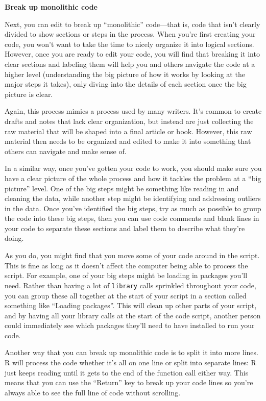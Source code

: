 \documentclass[]{tufte-book}
\begin{document}
\textbf{Break up monolithic code}

Next, you can edit to break up ``monolithic'' code---that is, code that isn't
clearly divided to show sections or steps in the process. When you're first
creating your code, you won't want to take the time to nicely organize it into
logical sections. However, once you are ready to edit your code, you will find
that breaking it into clear sections and labeling them will help you and others
navigate the code at a higher level (understanding the big picture of how it
works by looking at the major steps it takes), only diving into the details of
each section once the big picture is clear.

Again, this process mimics a process used by many writers. It's common to
create drafts and notes that lack clear organization, but instead are just
collecting the raw material that will be shaped into a final article or book.
However, this raw material then needs to be organized and edited to make it
into something that others can navigate and make sense of.

In a similar way, once you've gotten your code to work, you should make sure you have
a clear picture of the whole process and how it tackles the problem at a
``big picture'' level. One of the big steps might be something like reading in
and cleaning the data, while another step might be identifying and addressing
outliers in the data. Once you've identified the big steps, try as much as
possible to group the code into these big steps, then you can use code comments
and blank lines in your code to separate these sections and label them to
describe what they're doing.

As you do, you might find that you move some of your code around in the script.
This is fine as long as it doesn't affect the computer being able to process the
script. For example, one of your big steps might be loading in packages you'll
need. Rather than having a lot of \texttt{library} calls sprinkled throughout your
code, you can group these all together at the start of your script in a section
called something like ``Loading packages''. This will clean up other parts of your
script, and by having all your library calls at the start of the code script,
another person could immediately see which packages they'll need to have
installed to run your code.

Another way that you can break up monolithic code is to split it into more lines.
R will process the code whether it's all on one line or split into separate
lines: R just keeps reading until it gets to the end of the function call
either way. This means that you can use the ``Return'' key to break up your code
lines so you're always able to see the full line of code without scrolling.
\end{document}
